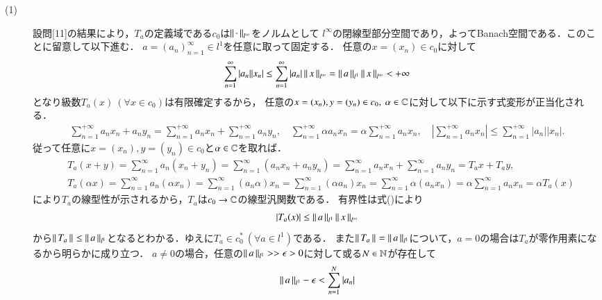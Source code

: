 \begin{prf}
\begin{description}\mbox{}
	\item[(1)] 
		設問[11]の結果により，$T_a$の定義域である$c_0$は$\left\|\, \cdot\, \right\|_{l^{\infty}}$をノルムとして
		$l^{\infty}$の閉線型部分空間であり，よってBanach空間である．このことに留意して以下進む．
		$a = (a_n)_{n=1}^{\infty} \in l^1$を任意に取って固定する．
		任意の$x=(x_n) \in c_0$に対して
		\begin{align}
			\sum_{n=1}^{\infty} |a_n| |x_n| \leq \sum_{n=1}^{\infty} |a_n| \left\|\, x\, \right\|_{l^{\infty}} = \left\|\, a\, \right\|_{l^1} \left\|\, x\, \right\|_{l^{\infty}} < +\infty
			\label{eq:func_analy_Q12}
		\end{align}
		となり級数$T_a (x)\ (\forall x \in c_0)$は有限確定するから，
		任意の$x=(x_n), y=(y_n) \in c_0,\ \alpha \in \mathbb{C}$に対して以下に示す式変形が正当化される．
		\begin{align}
			\sum_{n=1}^{+\infty} a_n x_n + a_n y_n = \sum_{n=1}^{+\infty} a_n x_n + \sum_{n=1}^{+\infty} a_n y_n,\quad 
			\sum_{n=1}^{+\infty} \alpha a_n x_n = \alpha \sum_{n=1}^{+\infty} a_n x_n,\quad
			\left| \sum_{n=1}^{+\infty} a_n x_n \right| \leq \sum_{n=1}^{+\infty} |a_n||x_n|.
		\end{align}
		従って任意に$x=(x_n), y=(y_n) \in c_0$と$\alpha \in \mathbb{C}$を取れば．
		\begin{align}
			&T_a(x + y) = \sum_{n=1}^{\infty}a_n (x_n + y_n) 
			= \sum_{n=1}^{\infty} (a_n x_n + a_n y_n) = \sum_{n=1}^{\infty}a_n x_n + \sum_{n=1}^{\infty}a_n y_n = T_a x + T_a y, \\
			&T_a(\alpha x) = \sum_{n=1}^{\infty}a_n(\alpha x_n) = \sum_{n=1}^{\infty}(a_n\alpha)x_n = \sum_{n=1}^{\infty}(\alpha a_n)x_n
			= \sum_{n=1}^{\infty}\alpha (a_n x_n) = \alpha \sum_{n=1}^{\infty} a_n x_n = \alpha T_a(x)
		\end{align}
		により$T_a$の線型性が示されるから，$T_a$は$c_0 \rightarrow \mathbb{C}$の線型汎関数である．
		有界性は式()により
		\begin{align}
			|T_a(x)| \leq \left\|\, a\, \right\|_{l^1} \left\|\, x\, \right\|_{l^{\infty}}
		\end{align}
		から$\left\|\, T_a\, \right\|_{} \leq \left\|\, a\, \right\|_{l^1}$となるとわかる．ゆえに$T_a \in c_0^*\ (\forall a \in l^1)$である．
		また$\left\|\, T_a\, \right\|_{} = \left\|\, a\, \right\|_{l^1}$について，$a=0$の場合は$T_a$が零作用素になるから明らかに成り立つ．
		$a \neq 0$の場合，任意の$\left\|\, a\, \right\|_{l^1} >> \epsilon >0$に対して或る$N \in \mathbb{N}$が存在して
		\begin{align}
			\left\|\, a\, \right\|_{l^1} - \epsilon < \sum_{n = 1}^{N} |a_n|
		\end{align}

\end{description}
\end{prf}
